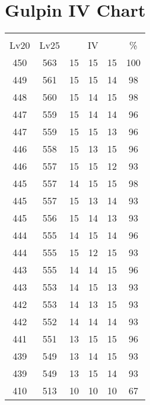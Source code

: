 \documentclass{article}%
\begin{document}
%
\normalsize%
\section{Gulpin IV Chart}%
\label{sec:Gulpin IV Chart}%
\renewcommand{\arraystretch}{1.5}%
\begin{tabular}{|c|c|c|c|c|c|}%
\hline%
\multicolumn{6}{|c|}{\textcolor{white}{ 
\linebreak{Gulpin}
}%
\cellcolor{black}}\\%
\multicolumn{1}{|c}{Lv20}&\multicolumn{1}{c|}{Lv25}&\multicolumn{3}{c|}{IV}&\multicolumn{1}{|c|}{\%}\\%
\hline%
\rowcolor{color100}%
450&563&15&15&15&100\\%
\hline%
\rowcolor{color98}%
449&561&15&15&14&98\\%
\hline%
\rowcolor{color98}%
448&560&15&14&15&98\\%
\hline%
\rowcolor{color96}%
447&559&15&14&14&96\\%
\hline%
\rowcolor{color96}%
447&559&15&15&13&96\\%
\hline%
\rowcolor{color96}%
446&558&15&13&15&96\\%
\hline%
\rowcolor{color93}%
446&557&15&15&12&93\\%
\hline%
\rowcolor{color98}%
445&557&14&15&15&98\\%
\hline%
\rowcolor{color93}%
445&557&15&13&14&93\\%
\hline%
\rowcolor{color93}%
445&556&15&14&13&93\\%
\hline%
\rowcolor{color96}%
444&555&14&15&14&96\\%
\hline%
\rowcolor{color93}%
444&555&15&12&15&93\\%
\hline%
\rowcolor{color96}%
443&555&14&14&15&96\\%
\hline%
\rowcolor{color93}%
443&553&14&15&13&93\\%
\hline%
\rowcolor{color93}%
442&553&14&13&15&93\\%
\hline%
\rowcolor{color93}%
442&552&14&14&14&93\\%
\hline%
\rowcolor{color96}%
441&551&13&15&15&96\\%
\hline%
\rowcolor{color93}%
439&549&13&14&15&93\\%
\hline%
\rowcolor{color93}%
439&549&13&15&14&93\\%
\hline%
\rowcolor{color91}%
410&513&10&10&10&67\\%
\end{tabular}

%
\end{document}
